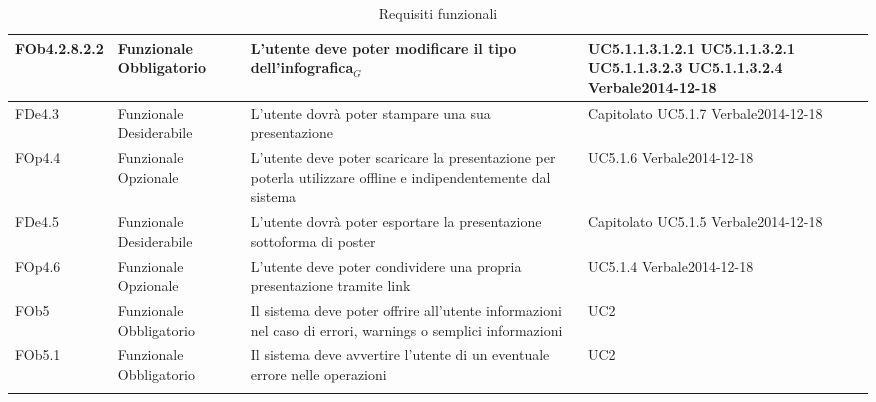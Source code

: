 \begin{longtable}{|l|p{2.5cm}|p{5cm}|p{3.5cm}|}
\hline
FOb4.2.8.2.2 & Funzionale \linebreak Obbligatorio & L'utente deve poter modificare il tipo dell'infografica$_G$ & UC5.1.1.3.1.2.1 \linebreak  UC5.1.1.3.2.1 \linebreak  UC5.1.1.3.2.3 \linebreak  UC5.1.1.3.2.4 \linebreak  Verbale2014-12-18 \linebreak  \\
\hline
FDe4.3 & Funzionale \linebreak Desiderabile & L'utente dovrà poter stampare una sua presentazione & Capitolato \linebreak  UC5.1.7 \linebreak  Verbale2014-12-18 \linebreak  \\
\hline
FOp4.4 & Funzionale \linebreak Opzionale & L'utente deve poter scaricare la presentazione per poterla utilizzare offline e indipendentemente dal sistema & UC5.1.6 \linebreak  Verbale2014-12-18 \linebreak  \\
\hline
FDe4.5 & Funzionale \linebreak Desiderabile & L'utente dovrà poter esportare la presentazione sottoforma di poster & Capitolato \linebreak  UC5.1.5 \linebreak  Verbale2014-12-18 \linebreak  \\
\hline
FOp4.6 & Funzionale \linebreak Opzionale & L'utente deve poter condividere una propria presentazione tramite link & UC5.1.4 \linebreak  Verbale2014-12-18 \linebreak  \\
\hline
FOb5 & Funzionale \linebreak Obbligatorio & Il sistema deve poter offrire all'utente informazioni nel caso di errori, warnings o semplici informazioni & UC2 \linebreak \\
\hline
FOb5.1 & Funzionale \linebreak Obbligatorio & Il sistema deve avvertire l'utente di un eventuale errore nelle operazioni & UC2 \linebreak  \\
\hline
\caption{Requisiti funzionali}
\end{longtable}

